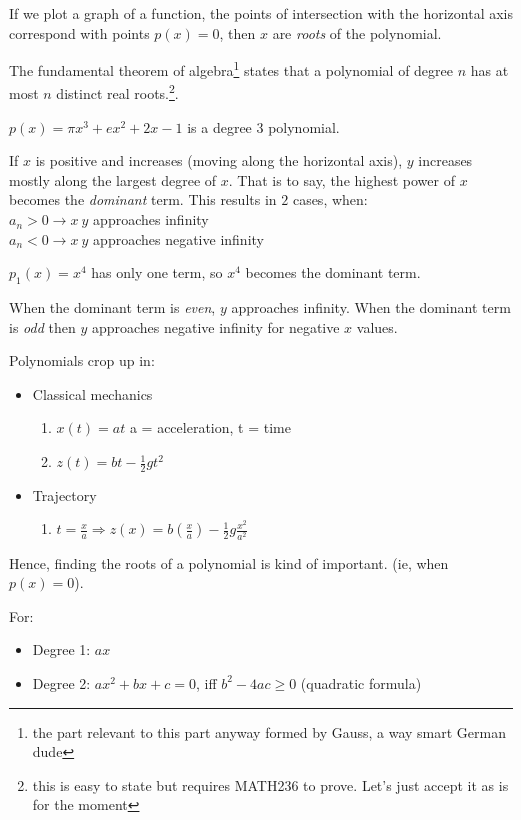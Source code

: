 \noindent If we plot a graph of a function, the points of intersection with the
horizontal axis correspond with points $p(x)=0$, then $x$ are \emph{roots} of
the polynomial.

\noindent The fundamental theorem of algebra\footnote{the part relevant to this
part anyway formed by Gauss, a way smart German dude} states that a polynomial
of degree $n$ has at most $n$ distinct real roots.\footnote{this is easy to
state but requires MATH236 to prove. Let's just accept it as is for the moment}.

$p(x) = \pi x^3 + ex^2 + 2x - 1$ is a degree $3$ polynomial.

\noindent If $x$ is positive and increases (moving along the horizontal axis),
$y$ increases mostly along the largest degree of $x$. That is to say, the highest
power of $x$ becomes the \emph{dominant} term. This results in $2$ cases, when:
\\
$a_n > 0 \to x ~ y$ approaches infinity \\
$a_n < 0 \to x ~ y$ approaches negative infinity

\noindent $p_1(x) = x^4$ has only one term, so $x^4$ becomes the dominant term.

\noindent When the dominant term is \emph{even}, $y$ approaches infinity. When
the dominant term is \emph{odd} then $y$ approaches negative infinity for
negative $x$ values.

\noindent Polynomials crop up in:
\begin{itemize}
  \item Classical mechanics
  \begin{enumerate}
    \item $x(t) = at$ a = acceleration, t = time
    \item $z(t) = bt - \frac{1}{2}gt^2$
  \end{enumerate}
  \item Trajectory
  \begin{enumerate}
    \item $t = \frac{x}{a} \Rightarrow z(x) = b(\frac{x}{a}) - \frac{1}{2}g\frac{x^2}{a^2}$
  \end{enumerate}
\end{itemize}

Hence, finding the roots of a polynomial is kind of important. (ie, when
$p(x) = 0$).

For:
\begin{itemize}
  \item Degree 1: $ax$
  \item Degree 2: $ax^2 + bx + c = 0$, iff $b^2-4ac \geq 0$ (quadratic formula)
\end{itemize}

